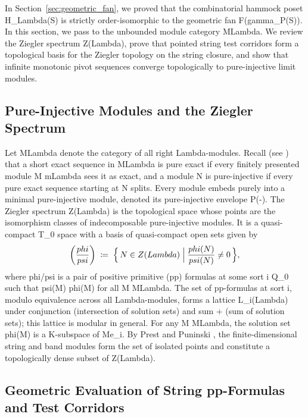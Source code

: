 \documentclass[11pt,a4paper,reqno]{amsart}
\def\({}%
\def\){}%
\def\mathcal#1{#1}%
\def\mathbb#1{#1}%
\def\operatorname#1{#1}%
\def\K{K}%
\def\Zg{Z}%
\def\Mod{M}%
\def\md{m}%
\def\PE{P}%
\def\neq{\not=}%
\def\gamma{gamma}%
\def\phi{phi}%
\def\psi{psi}%
\def\Lambda{Lambda}%
\def\emph#1{#1}%
\theoremstyle{definition}
\theoremstyle{remark}
\newcommand{\K}{\mathbb{K}}
\newcommand{\Mod}[1]{\operatorname{Mod}(#1)}
\newcommand{\md}[1]{\operatorname{mod}(#1)}
\newcommand{\Zg}{\operatorname{Zg}}
\newcommand{\PE}{\operatorname{PE}}
\begin{document}
In Section~\ref{sec:geometric_fan}, we proved that the combinatorial hammock poset \(H_\Lambda(S)\) is strictly order-isomorphic to the geometric fan \(\mathcal{F}(\gamma_{P(S)})\). In this section, we pass to the unbounded module category \(\Mod{\Lambda}\). We review the Ziegler spectrum \(\Zg(\Lambda)\), prove that pointed string test corridors form a topological basis for the Ziegler topology on the string closure, and show that infinite monotonic pivot sequences converge topologically to pure-injective limit modules.

\subsection{Pure-Injective Modules and the Ziegler Spectrum}
\label{subsec:pure_injective}

Let \(\Mod{\Lambda}\) denote the category of all right \(\Lambda\)-modules. Recall (see \cite{Prest2009, Ziegler1984}) that a short exact sequence in \(\Mod{\Lambda}\) is \emph{pure exact} if every finitely presented module \(M \in \md{\Lambda}\) sees it as exact, and a module \(N\) is \emph{pure-injective} if every pure exact sequence starting at \(N\) splits. Every module embeds purely into a minimal pure-injective module, denoted its \emph{pure-injective envelope} \(\PE(-)\). The \emph{Ziegler spectrum} \(\Zg(\Lambda)\) is the topological space whose points are the isomorphism classes of indecomposable pure-injective modules. It is a quasi-compact \(T_0\) space with a basis of quasi-compact open sets given by
\[
\left(\frac{\phi}{\psi}\right) \;\coloneqq\; \Bigl\{\, N \in \Zg(\Lambda) \;\Big|\; \frac{\phi(N)}{\psi(N)} \neq 0 \,\Bigr\},
\]
where \(\phi/\psi\) is a pair of positive primitive (pp) formulas at some sort \(i \in Q_0\) such that \(\psi(M) \subseteq \phi(M)\) for all \(M \in \Mod{\Lambda}\). The set of pp-formulas at sort \(i\), modulo equivalence across all \(\Lambda\)-modules, forms a lattice \(\mathcal{L}_i(\Lambda)\) under conjunction \(\wedge\) (intersection of solution sets) and sum \(+\) (sum of solution sets); this lattice is modular in general. For any \(M \in \Mod{\Lambda}\), the solution set \(\phi(M)\) is a \(\K\)-subspace of \(Me_i\). By Prest and Puninski \cite{PrestPuninski2002}, the finite-dimensional string and band modules form the set of isolated points and constitute a topologically dense subset of \(\Zg(\Lambda)\).

\subsection{Geometric Evaluation of String pp-Formulas and Test Corridors}
\label{subsec:geometric_pp}
\end{document}
